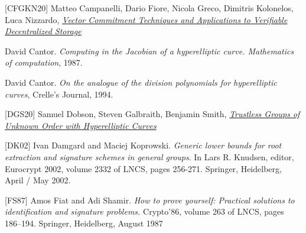 \documentclass[11pt, lettersize, notitlepage, leqno, footskip=0.6cm]{article}
\newcommand{\noin}{\noindent}
\numberwithin{equation}{section}
\begin{document}
\noin \hypertarget{CFGKN20}{[CFGKN20]} Matteo Campanelli, Dario Fiore, Nicola Greco, Dimitris Kolonelos, Luca Nizzardo, \href{https://eprint.iacr.org/2020/149}{\textit{Vector Commitment Techniques and Applications to Verifiable Decentralized Storage}} \vspace{0.1cm}


\noin [Can87] David Cantor. \textit{Computing in the Jacobian of a hyperelliptic curve. Mathematics of computation}, 1987.\vspace{0.1cm}

\noin [Can94] David Cantor. \textit{On the analogue of the division polynomials for hyperelliptic curves}, Crelle's Journal, 1994.\vspace{0.1cm}

\noin \hypertarget{DGS20}{[DGS20]} Samuel Dobson, Steven Galbraith, Benjamin Smith, \href{https://eprint.iacr.org/2020/196}{\textit{Trustless Groups of Unknown Order with Hyperelliptic Curves}} \vspace{0.1cm}

\noin \hypertarget{{DK02}}{[DK02]} Ivan Damgard and Maciej Koprowski. \textit{Generic lower bounds for root extraction and signature schemes in general groups}. In Lars R. Knudsen, editor, Eurocrypt 2002, volume 2332 of LNCS, pages 256-271. Springer, Heidelberg, April / May 2002.\vspace{0.1cm}


\noin \hypertarget{FS87}{[FS87]} Amos Fiat and Adi Shamir. \textit{How to prove yourself: Practical solutions to identification and signature problems.} Crypto’86, volume 263 of LNCS, pages 186–194. Springer, Heidelberg, August 1987\vspace{0.1cm}

\end{document}
